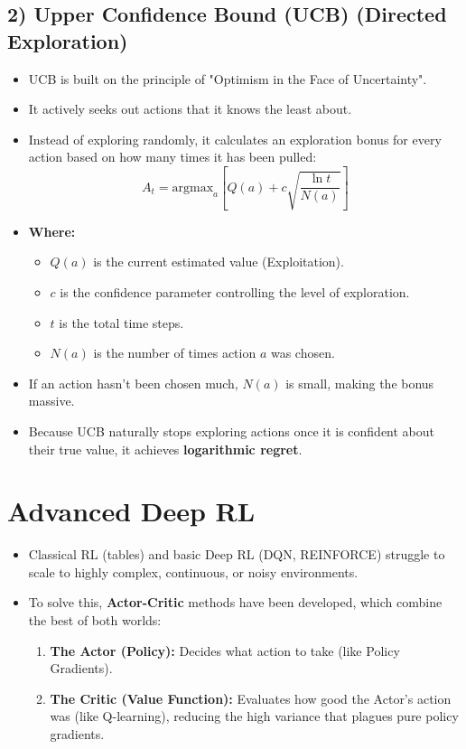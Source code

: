 \documentclass[12pt]{article}
\begin{document}
\subsection*{2) Upper Confidence Bound (UCB) (Directed Exploration)}
\begin{itemize}[label=$\bullet$]
    \item UCB is built on the principle of "Optimism in the Face of Uncertainty".
    \item It actively seeks out actions that it knows the least about.
    \item Instead of exploring randomly, it calculates an exploration bonus for every action based on how many times it has been pulled:
    $$A_t = \text{argmax}_a \left[ Q(a) + c \sqrt{\frac{\ln t}{N(a)}} \right]$$
    \item \textbf{Where:}
    \begin{itemize}[label=$\circ$]
        \item $Q(a)$ is the current estimated value (Exploitation).
        \item $c$ is the confidence parameter controlling the level of exploration.
        \item $t$ is the total time steps.
        \item $N(a)$ is the number of times action $a$ was chosen.
    \end{itemize}
    \item If an action hasn't been chosen much, $N(a)$ is small, making the bonus massive.
    \item Because UCB naturally stops exploring actions once it is confident about their true value, it achieves \textbf{logarithmic regret}.
\end{itemize}

\section*{Advanced Deep RL}
\begin{itemize}[label=$\bullet$]
    \item Classical RL (tables) and basic Deep RL (DQN, REINFORCE) struggle to scale to highly complex, continuous, or noisy environments.
    \item To solve this, \textbf{Actor-Critic} methods have been developed, which combine the best of both worlds:
    \begin{enumerate}
        \item \textbf{The Actor (Policy):} Decides what action to take (like Policy Gradients).
        \item \textbf{The Critic (Value Function):} Evaluates how good the Actor's action was (like Q-learning), reducing the high variance that plagues pure policy gradients.
    \end{enumerate}
\end{itemize}
\end{document}
